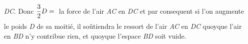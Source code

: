 \textit{DC}. Donc $\displaystyle\frac{3}{2}D=\rule[-4mm]{0mm}{10mm}$%
                     la force de l'air \textit{AC} en \textit{DC} et par consequent si l'on augmente le poids \textit{D} de sa moiti\'{e}, il so\^{u}tiendra le ressort de l'air \textit{AC} en \textit{DC} quoyque l'air en \textit{BD} n'y contribue rien, et quoyque l'espace \textit{BD} soit vuide.
                     \pend 
                     